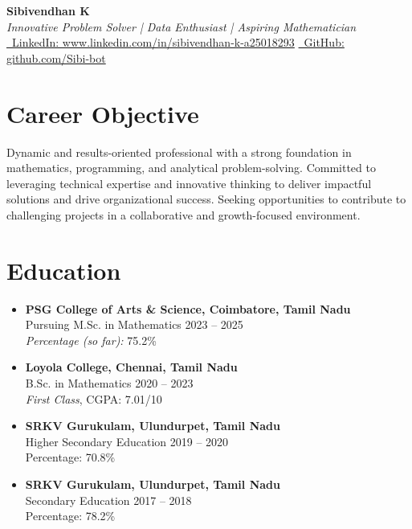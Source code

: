 \documentclass[a4paper,10pt]{article}
\begin{document}
\begin{center}
    {\Huge \textbf{Sibivendhan K}} \\
    \vspace{3pt}
    \textit{Innovative Problem Solver | Data Enthusiast | Aspiring Mathematician} \\
    \vspace{5pt}
    \href{http://www.linkedin.com/in/sibivendhan-k-a25018293}{\faLinkedin \ LinkedIn: www.linkedin.com/in/sibivendhan-k-a25018293} \hspace{0.5cm}
    \href{https://github.com/Sibi-bot}{\faGithub \ GitHub: github.com/Sibi-bot}
\end{center}

\vspace{0.5cm}

\section*{Career Objective}
Dynamic and results-oriented professional with a strong foundation in mathematics, programming, and analytical problem-solving. Committed to leveraging technical expertise and innovative thinking to deliver impactful solutions and drive organizational success. Seeking opportunities to contribute to challenging projects in a collaborative and growth-focused environment.

\section*{Education}
\begin{itemize}[leftmargin=1.5cm]
    \item \textbf{PSG College of Arts \& Science, Coimbatore, Tamil Nadu} \\
    Pursuing M.Sc. in Mathematics \hfill 2023 -- 2025 \\
    \textit{Percentage (so far):} 75.2\%
    \item \textbf{Loyola College, Chennai, Tamil Nadu} \\
    B.Sc. in Mathematics \hfill 2020 -- 2023 \\
    \textit{First Class}, CGPA: 7.01/10
    \item \textbf{SRKV Gurukulam, Ulundurpet, Tamil Nadu} \\
    Higher Secondary Education \hfill 2019 -- 2020 \\
    Percentage: 70.8\%
    \item \textbf{SRKV Gurukulam, Ulundurpet, Tamil Nadu} \\
    Secondary Education \hfill 2017 -- 2018 \\
    Percentage: 78.2\%
\end{itemize}
\end{document}
